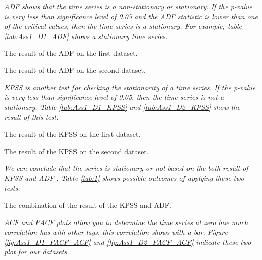 \documentclass[12pt]{article}
\begin{document}
\begin{enumerate}
\textit{\gls{ADF} shows that the time series is a non-stationary or stationary. If the p-value is very less than significance level of 0.05 and the \gls{ADF} statistic is lower than one of the critical values, then the time series is a stationary. For example, table \ref{tab:Ass1_D1_ADF} shows a stationary time series.}

\begin{table}[H]
\centering
\caption{The result of the \gls{ADF} on the first dataset.}
\label{tab:Ass1_D1_ADF}

\end{table}

\begin{table}[H]
\centering
\caption{The result of the \gls{ADF} on the second dataset.}
\label{tab:Ass1_D2_ADF}

\end{table}


\textit{ \gls{KPSS} is another test for checking the stationarity of a time series. If the p-value is very less than significance level of 0.05, then the time series is not a stationary. Table \ref{tab:Ass1_D1_KPSS} and \ref{tab:Ass1_D2_KPSS} show the result of  this test.}

\begin{table}[H]
\centering
\caption{The result of the \gls{KPSS} on the first dataset.}
\label{tab:Ass1_D1_KPSS}

\end{table}

\begin{table}[H]
\centering
\caption{The result of the \gls{KPSS} on the second dataset.}
\label{tab:Ass1_D2_KPSS}

\end{table}

\textit{We can conclude that the series is stationary or not based on the both result of \gls{KPSS} and \gls{ADF} \cite{StationarityStatsmodels}. Table \ref{tab:1} shows possible outcomes of applying these two tests.}

\begin{table}[H]
\centering
\caption{The combination of the result of the \gls{KPSS} and \gls{ADF}.}
\label{tab:1}

\end{table}



\textit{\gls{ACF}  and \gls{PACF} plots allow you to determine the time series at zero hoe much correlation has with other lags. this correlation shows with a bar. Figure \ref{fig:Ass1_D1_PACF_ACF} and \ref{fig:Ass1_D2_PACF_ACF} indicate these two plot for our datasets.}




\end{enumerate}
\end{document}
